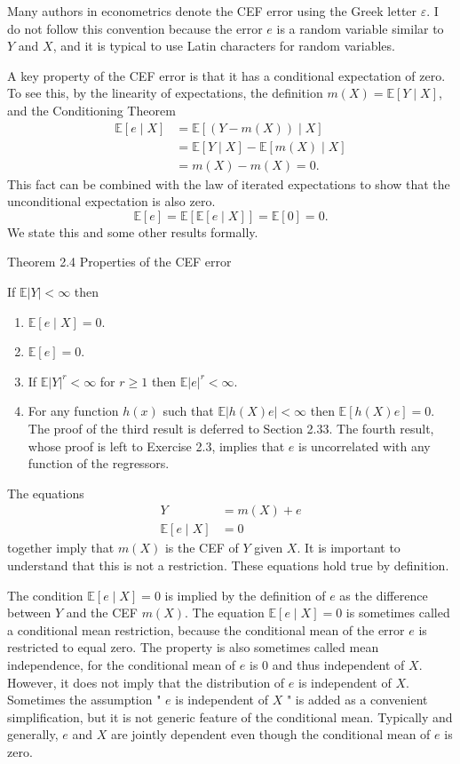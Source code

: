 \documentclass[10pt]{article}
\begin{document}
Many authors in econometrics denote the CEF error using the Greek letter $\varepsilon$. I do not follow this convention because the error $e$ is a random variable similar to $Y$ and $X$, and it is typical to use Latin characters for random variables.

A key property of the CEF error is that it has a conditional expectation of zero. To see this, by the linearity of expectations, the definition $m(X)=\mathbb{E}[Y \mid X]$, and the Conditioning Theorem
$$
\begin{aligned}
\mathbb{E}[e \mid X] &=\mathbb{E}[(Y-m(X)) \mid X] \\
&=\mathbb{E}[Y \mid X]-\mathbb{E}[m(X) \mid X] \\
&=m(X)-m(X)=0 .
\end{aligned}
$$
This fact can be combined with the law of iterated expectations to show that the unconditional expectation is also zero.
$$
\mathbb{E}[e]=\mathbb{E}[\mathbb{E}[e \mid X]]=\mathbb{E}[0]=0 .
$$
We state this and some other results formally.

Theorem 2.4 Properties of the CEF error

If $\mathbb{E}|Y|<\infty$ then

\begin{enumerate}
  \item $\mathbb{E}[e \mid X]=0$.

  \item $\mathbb{E}[e]=0$.

  \item If $\mathbb{E}|Y|^{r}<\infty$ for $r \geq 1$ then $\mathbb{E}|e|^{r}<\infty$.

  \item For any function $h(x)$ such that $\mathbb{E}|h(X) e|<\infty$ then $\mathbb{E}[h(X) e]=0$. The proof of the third result is deferred to Section 2.33. The fourth result, whose proof is left to Exercise 2.3, implies that $e$ is uncorrelated with any function of the regressors.

\end{enumerate}
The equations
$$
\begin{aligned}
Y &=m(X)+e \\
\mathbb{E}[e \mid X] &=0
\end{aligned}
$$
together imply that $m(X)$ is the CEF of $Y$ given $X$. It is important to understand that this is not a restriction. These equations hold true by definition.

The condition $\mathbb{E}[e \mid X]=0$ is implied by the definition of $e$ as the difference between $Y$ and the CEF $m(X)$. The equation $\mathbb{E}[e \mid X]=0$ is sometimes called a conditional mean restriction, because the conditional mean of the error $e$ is restricted to equal zero. The property is also sometimes called mean independence, for the conditional mean of $e$ is 0 and thus independent of $X$. However, it does not imply that the distribution of $e$ is independent of $X$. Sometimes the assumption " $e$ is independent of $X$ " is added as a convenient simplification, but it is not generic feature of the conditional mean. Typically and generally, $e$ and $X$ are jointly dependent even though the conditional mean of $e$ is zero.
\end{document}
